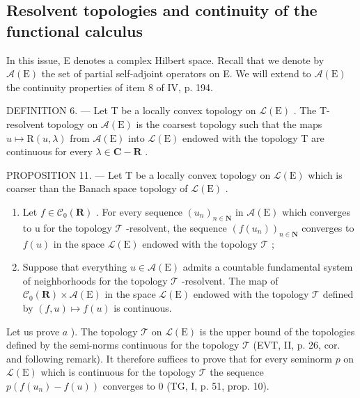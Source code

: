\subsection{Resolvent topologies and continuity of the functional calculus}

In this issue, E denotes a complex Hilbert space. Recall that we denote by \(\mathcal{A}(\mathrm{E})\) the set of partial self-adjoint operators on E. We will extend to \(\mathcal{A}(\mathrm{E})\) the continuity properties of item 8 of IV, p. 194.

DEFINITION 6. --- Let T be a locally convex topology on \(\mathcal{L}(\mathrm{E})\) . The T-resolvent topology on \(\mathcal{A}(\mathrm{E})\) is the coarsest topology such that the maps \(u \mapsto \mathrm{R}(u, \lambda)\) from \(\mathcal{A}(\mathrm{E})\) into \(\mathcal{L}(\mathrm{E})\) endowed with the topology T are continuous for every \(\lambda \in \mathbf{C} - \mathbf{R}\) .

PROPOSITION 11. --- Let T be a locally convex topology on \(\mathcal{L}(\mathrm{E})\) which is coarser than the Banach space topology of \(\mathcal{L}(\mathrm{E})\) .

\begin{enumerate}
\def\labelenumi{\alph{enumi})}
\item
  Let \(f \in \mathcal{C}_0(\mathbf{R})\) . For every sequence \((u_n)_{n \in \mathbf{N}}\) in \(\mathcal{A}(\mathrm{E})\) which converges to u for the topology \(\mathcal{T}\) -resolvent, the sequence \((f(u_n))_{n \in \mathbf{N}}\) converges to \(f(u)\) in the space \(\mathcal{L}(\mathrm{E})\) endowed with the topology \(\mathcal{T}\) ;
\item
  Suppose that everything \(u \in \mathcal{A}(\mathrm{E})\) admits a countable fundamental system of neighborhoods for the topology \(\mathcal{T}\) -resolvent. The map of \(\mathcal{C}_0(\mathbf{R}) \times \mathcal{A}(\mathrm{E})\) in the space \(\mathcal{L}(\mathrm{E})\) endowed with the topology \(\mathcal{T}\) defined by \((f, u) \mapsto f(u)\) is continuous.
\end{enumerate}

Let us prove \(a\) ). The topology \(\mathcal{T}\) on \(\mathcal{L}(\mathrm{E})\) is the upper bound of the topologies defined by the semi-norms continuous for the topology \(\mathcal{T}\) (EVT, II, p. 26, cor. and following remark). It therefore suffices to prove that for every seminorm \(p\) on \(\mathcal{L}(\mathrm{E})\) which is continuous for the topology \(\mathcal{T}\) the sequence \(p(f(u_n) - f(u))\) converges to 0 (TG, I, p. 51, prop. 10).


